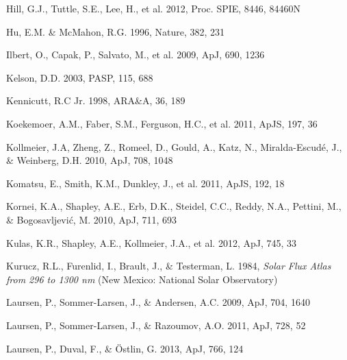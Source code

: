 \documentclass{emulateapj}
\def\apj{ApJ}
\def\apjs{ApJS}
\def\araa{ARA\&A}
\def\nat{Nature}
\def\pasp{PASP}
\def\spie{Proc. SPIE}
\begin{document}
\begin{thebibliography}{}
 Hill, G.J., Tuttle, S.E., Lee, H., et al. 2012, \spie, 8446, 84460N

 Hu, E.M. \& McMahon, R.G. 1996, \nat, 382, 231

 Ilbert, O., Capak, P., Salvato, M., et al. 2009, \apj, 690, 1236

 Kelson, D.D. 2003, \pasp, 115, 688

 Kennicutt, R.C Jr. 1998, \araa, 36, 189

 Koekemoer, A.M., Faber, S.M., Ferguson, H.C., et al. 2011, \apjs, 197, 36

 Kollmeier, J.A, Zheng, Z., Romeel, D., Gould, A., Katz, N., Miralda-Escud\'{e}, J., \& Weinberg, D.H. 2010, \apj, 708, 1048

 Komatsu, E., Smith, K.M., Dunkley, J., et al. 2011, \apjs, 192, 18

 Kornei, K.A., Shapley, A.E., Erb, D.K., Steidel, C.C., Reddy, N.A., Pettini, M., \& Bogosavljevi\'{c}, M. 2010, \apj, 711, 693

 Kulas, K.R., Shapley, A.E., Kollmeier, J.A., et al. 2012, \apj, 745, 33 

 Kurucz, R.L., Furenlid, I., Brault, J., \& Testerman, L. 1984, \textit{Solar Flux Atlas from 296 to 1300 nm} (New Mexico: National Solar Observatory)

 Laursen, P., Sommer-Larsen, J., \& Andersen, A.C. 2009, \apj, 704, 1640

 Laursen, P., Sommer-Larsen, J., \& Razoumov, A.O. 2011, \apj, 728, 52

 Laursen, P., Duval, F., \& \"{O}stlin, G. 2013, \apj, 766, 124


\end{thebibliography}
\end{document}

